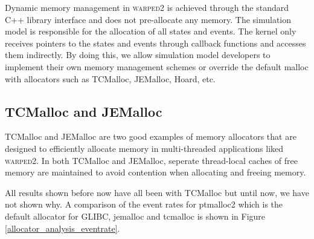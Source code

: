 \documentclass[11pt]{book}
\begin{document}
Dynamic memory management in \textsc{warped2} is achieved through the standard C++ library
interface and does not pre-allocate any memory.  The simulation model is responsible for the
allocation of all states and events.  The kernel only receives pointers to the states and events
through callback functions and accesses them indirectly.  By doing this, we allow simulation model
developers to implement their own memory management schemes or override the default malloc with
allocators such as TCMalloc, JEMalloc, Hoard, etc.

\subsection{TCMalloc and JEMalloc}

TCMalloc and JEMalloc are two good examples of memory allocators that are designed to efficiently
allocate memory in multi-threaded applications liked \textsc{warped2}.  In both TCMalloc and
JEMalloc, seperate thread-local caches of free memory are maintained to avoid contention when
allocating and freeing memory.

All results shown before now have all been with TCMalloc but until now, we have not shown why.
A comparison of the event rates for ptmalloc2 which is the default allocator for GLIBC, jemalloc
and tcmalloc is shown in Figure \ref{allocator_analysis_eventrate}.
\end{document}
